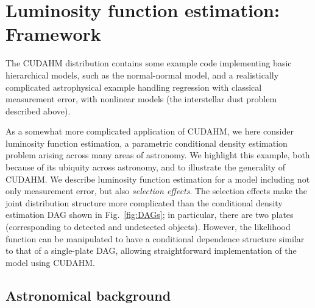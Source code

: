 \section{Luminosity function estimation: Framework}
\label{sec:lum_func}

The CUDAHM distribution contains some example code implementing basic hierarchical models, such as the normal-normal model, and a realistically complicated astrophysical example handling regression with classical measurement error, with nonlinear models (the interstellar dust problem described above).

As a somewhat more complicated application of CUDAHM, we here consider luminosity function estimation, a parametric conditional density estimation problem arising across many areas of astronomy.
We highlight this example, both because of its ubiquity across astronomy, and to illustrate the generality of CUDAHM.
We describe luminosity function estimation for a model including not only measurement error, but also \emph{selection effects}.
The selection effects make the joint distribution structure more complicated than the conditional density estimation DAG shown in Fig.~\ref{fig:DAGs}; in particular, there are two plates (corresponding to detected and undetected objects).
However, the likelihood function can be manipulated to have a conditional dependence structure similar to that of a single-plate DAG, allowing straightforward implementation of the model using CUDAHM.

\subsection{Astronomical background}
\label{sec:LF-astro}


